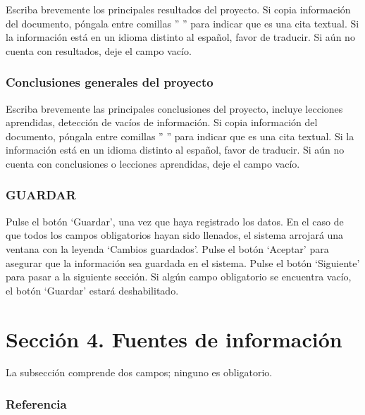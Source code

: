 \documentclass[
]{book}
\begin{document}
Escriba brevemente los principales resultados del proyecto.
Si copia información del documento, póngala entre comillas '' '' para indicar que es una cita textual. Si la información está en un idioma distinto al español, favor de traducir.
Si aún no cuenta con resultados, deje el campo vacío.

\hypertarget{conclusiones-generales-del-proyecto}{%
\subsection{Conclusiones generales del proyecto}\label{conclusiones-generales-del-proyecto}}

Escriba brevemente las principales conclusiones del proyecto, incluye lecciones aprendidas, detección de vacíos de información.
Si copia información del documento, póngala entre comillas '' '' para indicar que es una cita textual. Si la información está en un idioma distinto al español, favor de traducir.
Si aún no cuenta con conclusiones o lecciones aprendidas, deje el campo vacío.

\hypertarget{guardar-8}{%
\subsection{GUARDAR}\label{guardar-8}}

Pulse el botón `Guardar', una vez que haya registrado los datos.
En el caso de que todos los campos obligatorios hayan sido llenados, el sistema arrojará una ventana con la leyenda `Cambios guardados'. Pulse el botón `Aceptar' para asegurar que la información sea guardada en el sistema.
Pulse el botón `Siguiente' para pasar a la siguiente sección.
Si algún campo obligatorio se encuentra vacío, el botón `Guardar' estará deshabilitado.

\hypertarget{secciuxf3n-4.-fuentes-de-informaciuxf3n}{%
\chapter*{Sección 4. Fuentes de información}\label{secciuxf3n-4.-fuentes-de-informaciuxf3n}}

La subsección comprende dos campos; ninguno es obligatorio.

\hypertarget{referencia}{%
\subsection{Referencia}\label{referencia}}
\end{document}
